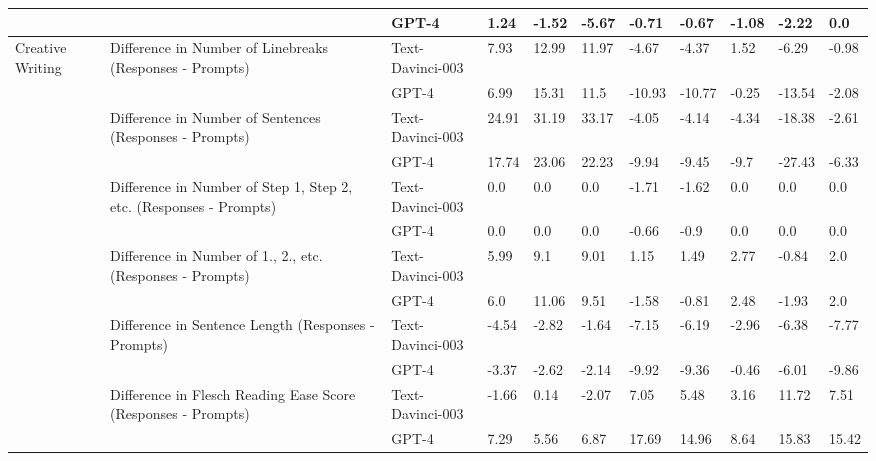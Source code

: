 \begin{tabular}{x{0.75cm}|x{1.5cm}|x{0.75cm}|x{0.75cm}|x{0.75cm}|x{0.75cm}|x{0.75cm}|x{0.75cm}|x{0.75cm}|x{0.75cm}|x{0.75cm}}
\hline
 &  & GPT-4 & 1.24 & -1.52 & -5.67 & -0.71 & -0.67 & -1.08 & -2.22 & 0.0 \\
\hline
Creative Writing & Difference in Number of Linebreaks (Responses - Prompts) & Text-Davinci-003 & 7.93 & 12.99 & 11.97 & -4.67 & -4.37 & 1.52 & -6.29 & -0.98 \\
\hline
 &  & GPT-4 & 6.99 & 15.31 & 11.5 & -10.93 & -10.77 & -0.25 & -13.54 & -2.08 \\
\hline
 & Difference in Number of Sentences (Responses - Prompts) & Text-Davinci-003 & 24.91 & 31.19 & 33.17 & -4.05 & -4.14 & -4.34 & -18.38 & -2.61 \\
\hline
 &  & GPT-4 & 17.74 & 23.06 & 22.23 & -9.94 & -9.45 & -9.7 & -27.43 & -6.33 \\
\hline
 & Difference in Number of Step 1, Step 2, etc. (Responses - Prompts) & Text-Davinci-003 & 0.0 & 0.0 & 0.0 & -1.71 & -1.62 & 0.0 & 0.0 & 0.0 \\
\hline
 &  & GPT-4 & 0.0 & 0.0 & 0.0 & -0.66 & -0.9 & 0.0 & 0.0 & 0.0 \\
\hline
 & Difference in Number of 1., 2., etc. (Responses - Prompts) & Text-Davinci-003 & 5.99 & 9.1 & 9.01 & 1.15 & 1.49 & 2.77 & -0.84 & 2.0 \\
\hline
 &  & GPT-4 & 6.0 & 11.06 & 9.51 & -1.58 & -0.81 & 2.48 & -1.93 & 2.0 \\
\hline
 & Difference in Sentence Length (Responses - Prompts) & Text-Davinci-003 & -4.54 & -2.82 & -1.64 & -7.15 & -6.19 & -2.96 & -6.38 & -7.77 \\
\hline
 &  & GPT-4 & -3.37 & -2.62 & -2.14 & -9.92 & -9.36 & -0.46 & -6.01 & -9.86 \\
\hline
 & Difference in Flesch Reading Ease Score (Responses - Prompts) & Text-Davinci-003 & -1.66 & 0.14 & -2.07 & 7.05 & 5.48 & 3.16 & 11.72 & 7.51 \\
\hline
 &  & GPT-4 & 7.29 & 5.56 & 6.87 & 17.69 & 14.96 & 8.64 & 15.83 & 15.42 \\
\hline
\bottomrule
\end{tabular}
